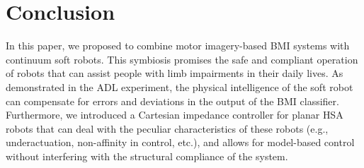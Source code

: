 \section{Conclusion}
In this paper, we proposed to combine motor imagery-based \gls{BMI} systems with continuum soft robots. This symbiosis promises the safe and compliant operation of robots that can assist people with limb impairments in their daily lives.
As demonstrated in the \gls{ADL} experiment, the physical intelligence of the soft robot can compensate for errors and deviations in the output of the \gls{BMI} classifier.
Furthermore, we introduced a Cartesian impedance controller for planar \gls{HSA} robots that can deal with the peculiar characteristics of these robots (e.g., underactuation, non-affinity in control, etc.), and allows for model-based control without interfering with the structural compliance of the system.
